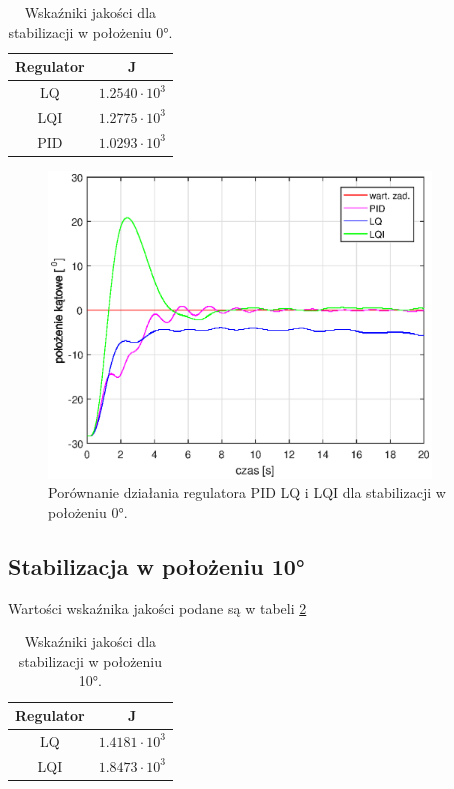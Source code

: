 \documentclass[11pt,a4paper]{article}
\begin{document}
\begin{table}[ht]
	\caption{Wskaźniki jakości dla stabilizacji w położeniu \ang{0}.}
	\label{por_reg_0_tab}
	\centering
	
	\begin{tabular}{|c|c|}
		\hline
		Regulator &J\\
		\hline
		LQ & $1.2540 \cdot 10 ^3$\\
		\hline
		LQI & $1.2775 \cdot 10 ^3$\\
		\hline
		PID & $ 1.0293 \cdot 10 ^3$\\ 
		\hline
	\end{tabular}
\end{table}

\begin{figure}[H]
	\centering
	\includegraphics[width=4in]{Figures/por_LQ0PID.eps}
	\caption{Porównanie działania regulatora PID LQ i LQI dla stabilizacji w położeniu \ang{0}.}
	\label{fig:por_LQPID_0}
\end{figure}

\subsection{Stabilizacja w położeniu \texorpdfstring{\ang{10}}{Lg}}
Wartości wskaźnika jakości podane są w tabeli \ref{por_reg_10_tab}

\begin{table}[ht]
	\caption{Wskaźniki jakości dla stabilizacji w położeniu \ang{10}.}
	\label{por_reg_10_tab}
	\centering
	
	\begin{tabular}{|c|c|}
		\hline
		Regulator &J\\
		\hline
		LQ & $1.4181 \cdot 10 ^3$\\
		\hline
		LQI & $1.8473 \cdot 10 ^3$\\
		\hline
	\end{tabular}
\end{table}
\end{document}
